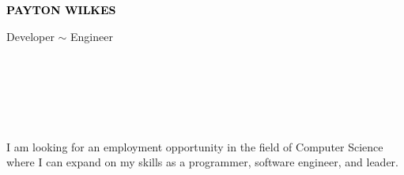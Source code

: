 \documentclass[9pt]{developercv}
\begin{document}

\begin{minipage}[t]{0.5\textwidth}
	\vspace{-\baselineskip} %

	{ \fontsize{16}{20} \textcolor{black}{\textbf{\MakeUppercase{Payton Wilkes}}}} %

	\vspace{6pt}

	{\Large Developer $\sim$ Engineer} %
\end{minipage}
\hfill
\begin{minipage}[t]{0.2\textwidth} %
	\vspace{-\baselineskip} %

    \\
    \\

\end{minipage}
\begin{minipage}[t]{0.27\textwidth} %
	\vspace{-\baselineskip} %

	\\
    \\
\end{minipage}
\vspace{-10pt}

    \vspace{-8pt}
    \setlength{\parindent}{1.25em}
    I am looking for an employment opportunity in the field of Computer Science where I can expand on my skills as a programmer, software engineer, and leader.
    \setlength{\parindent}{0em}
\end{document}
